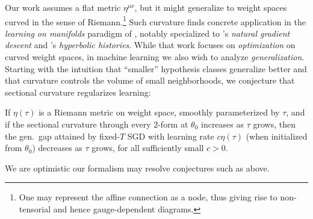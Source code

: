         Our work assumes a flat metric $\eta^{\mu\nu}$, but it might
        generalize to weight spaces curved in the sense of Riemann.\footnote{
            One may represent the affine connection as a node, thus giving
            rise to non-tensorial and hence gauge-dependent diagrams.
        }  Such curvature finds concrete application in the \emph{learning on
        manifolds} paradigm of \cite{ab07, zh16}, notably specialized to
        \cite{am98}'s \emph{natural gradient descent} and \cite{ni17}'s
        \emph{hyperbolic histories}.  While that work focuses on
        \emph{optimization} on curved weight spaces, in machine learning we
        also wish to analyze \emph{generalization}.
        Starting with the intuition that ``smaller'' hypothesis classes
        generalize better and that curvature controls the volume of small
        neighborhoods, we conjecture that sectional curvature regularizes
        learning:
        \begin{conj}
            If $\eta(\tau)$ is a Riemann metric on weight space, smoothly
            parameterized by $\tau$, and if the sectional curvature through
            every $2$-form at $\theta_0$ increases as $\tau$ grows, then
            the gen.\ gap attained by fixed-$T$ SGD with learning rate $c
            \eta(\tau)$ (when initialized from $\theta_0$) decreases as $\tau$
            grows, for all sufficiently small $c>0$.
        \end{conj}
        We are optimistic our formalism may resolve conjectures such as above.


